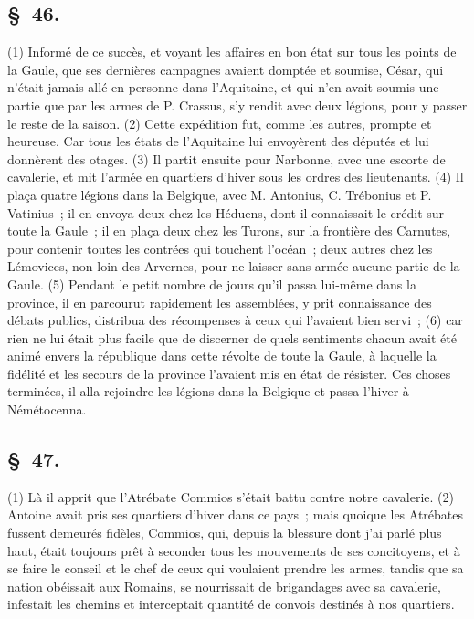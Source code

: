 \documentclass[french,twoside]{book} %
\begin{document}
\subsection[{§ 46.}]{ \textsc{§ 46.} }
\noindent (1) Informé de ce succès, et voyant les affaires en bon état sur tous les points de la Gaule, que ses dernières campagnes avaient domptée et soumise, César, qui n’était jamais allé en personne dans l’Aquitaine, et qui n’en avait soumis une partie que par les armes de P. Crassus, s’y rendit avec deux légions, pour y passer le reste de la saison. (2) Cette expédition fut, comme les autres, prompte et heureuse. Car tous les états de l’Aquitaine lui envoyèrent des députés et lui donnèrent des otages. (3) Il partit ensuite pour Narbonne, avec une escorte de cavalerie, et mit l’armée en quartiers d’hiver sous les ordres des lieutenants. (4) Il plaça quatre légions dans la Belgique, avec M. Antonius, C. Trébonius et P. Vatinius ; il en envoya deux chez les Héduens, dont il connaissait le crédit sur toute la Gaule ; il en plaça deux chez les Turons, sur la frontière des Carnutes, pour contenir toutes les contrées qui touchent l’océan ; deux autres chez les Lémovices, non loin des Arvernes, pour ne laisser sans armée aucune partie de la Gaule. (5) Pendant le petit nombre de jours qu’il passa lui-même dans la province, il en parcourut rapidement les assemblées, y prit connaissance des débats publics, distribua des récompenses à ceux qui l’avaient bien servi ; (6) car rien ne lui était plus facile que de discerner de quels sentiments chacun avait été animé envers la république dans cette révolte de toute la Gaule, à laquelle la fidélité et les secours de la province l’avaient mis en état de résister. Ces choses terminées, il alla rejoindre les légions dans la Belgique et passa l’hiver à Némétocenna.
\subsection[{§ 47.}]{ \textsc{§ 47.} }
\noindent (1) Là il apprit que l’Atrébate Commios s’était battu contre notre cavalerie. (2) Antoine avait pris ses quartiers d’hiver dans ce pays ; mais quoique les Atrébates fussent demeurés fidèles, Commios, qui, depuis la blessure dont j’ai parlé plus haut, était toujours prêt à seconder tous les mouvements de ses concitoyens, et à se faire le conseil et le chef de ceux qui voulaient prendre les armes, tandis que sa nation obéissait aux Romains, se nourrissait de brigandages avec sa cavalerie, infestait les chemins et interceptait quantité de convois destinés à nos quartiers.
\end{document}

